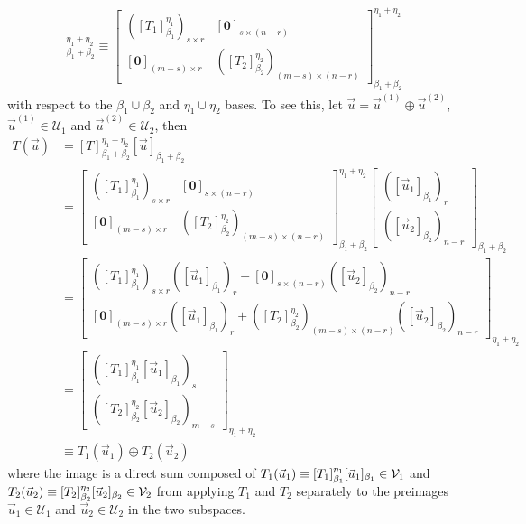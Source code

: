 \begin{align}
[T]_{\beta_1 + \beta_2}^{\eta_1 + \eta_2}
\equiv
\begin{bmatrix}
([T_1]_{\beta_1}^{\eta_1})_{s \times r} & [\textbf{0}]_{s \times (n-r)} \\
[\textbf{0}]_{(m-s) \times r} & ([T_2]_{\beta_2}^{\eta_2})_{(m-s) \times (n-r)}
\end{bmatrix}_{\beta_1 + \beta_2}^{\eta_1 + \eta_2}
\end{align}
with respect to the $\mathcal{\beta}_1 \cup \mathcal{\beta}_2$ and $\mathcal{\eta}_1 \cup \mathcal{\eta}_2$ bases. To see this, let $\vec{u} = \vec{u}^{(1)} \oplus \vec{u}^{(2)}$, $\vec{u}^{(1)} \in \mathcal{U}_1$ and $\vec{u}^{(2)} \in \mathcal{U}_2$, then
\begin{align*}
T(\vec{u}) &= [T]_{\beta_1 + \beta_2}^{\eta_1 + \eta_2}[\vec{u}]_{\beta_1 + \beta_2} \\ 
&= \begin{bmatrix}
([T_1]_{\beta_1}^{\eta_1})_{s \times r} & [\textbf{0}]_{s \times (n-r)} \\
[\textbf{0}]_{(m-s) \times r} & ([T_2]_{\beta_2}^{\eta_2})_{(m-s) \times (n-r)}
\end{bmatrix}_{\beta_1 + \beta_2}^{\eta_1 + \eta_2}
\begin{bmatrix}
([\vec{u}_1]_{\beta_1})_r \\
([\vec{u}_2]_{\beta_2})_{n-r}
\end{bmatrix}_{\beta_1 + \beta_2} \\
&= 
\begin{bmatrix}
([T_1]_{\beta_1}^{\eta_1})_{s \times r}([\vec{u}_1]_{\beta_1})_r + [\textbf{0}]_{s \times (n-r)}([\vec{u}_2]_{\beta_2})_{n-r} \\
[\textbf{0}]_{(m-s) \times r}([\vec{u}_1]_{\beta_1})_r + ([T_2]_{\beta_2}^{\eta_2})_{(m-s) \times (n-r)}([\vec{u}_2]_{\beta_2})_{n-r}
\end{bmatrix}_{\eta_1 + \eta_2} \\
&= 
\begin{bmatrix}
([T_1]_{\beta_1}^{\eta_1}[\vec{u}_1]_{\beta_1})_s \\
([T_2]_{\beta_2}^{\eta_2}[\vec{u}_2]_{\beta_2})_{m-s}
\end{bmatrix}_{\eta_1 + \eta_2} \\
&\equiv
T_1(\vec{u}_1) \oplus T_2(\vec{u}_2)
\end{align*}
where the image is a direct sum composed of $T_1(\vec{u}_1) \equiv \smash{[T_1]_{\beta_1}^{\eta_1}}[\vec{u}_1]_{\beta_1} \in \mathcal{V}_1$ and $T_2(\vec{u}_2) \equiv \smash{[T_2]_{\beta_2}^{\eta_2}}[\vec{u}_2]_{\beta_2} \in \mathcal{V}_2$ from applying $T_1$ and $T_2$ separately to the preimages $\vec{u}_1 \in \mathcal{U}_1$ and $\vec{u}_2 \in \mathcal{U}_2$ in the two subspaces.
